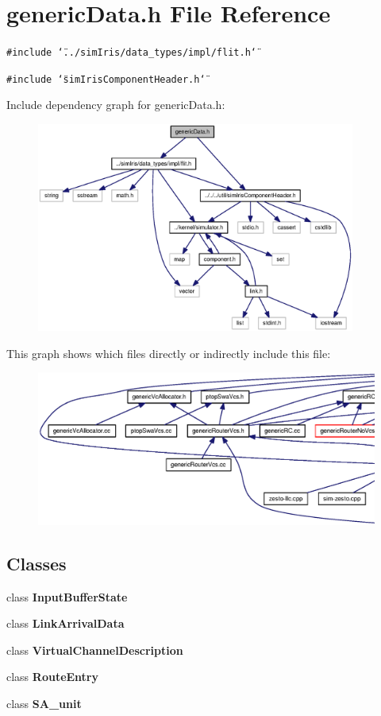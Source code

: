 \section{genericData.h File Reference}
\label{genericData_8h}
{\tt \#include \char`\"{}../simIris/data\_\-types/impl/flit.h\char`\"{}}\par
{\tt \#include \char`\"{}simIrisComponentHeader.h\char`\"{}}\par


Include dependency graph for genericData.h:\nopagebreak
\begin{figure}[H]
\begin{center}
\leavevmode
\includegraphics[width=297pt]{genericData_8h__incl}
\end{center}
\end{figure}


This graph shows which files directly or indirectly include this file:\nopagebreak
\begin{figure}[H]
\begin{center}
\leavevmode
\includegraphics[width=420pt]{genericData_8h__dep__incl}
\end{center}
\end{figure}
\subsection*{Classes}
\begin{CompactItemize}
\item 
class {\bf InputBufferState}
\item 
class {\bf LinkArrivalData}
\item 
class {\bf VirtualChannelDescription}
\item 
class {\bf RouteEntry}
\item 
class {\bf SA\_\-unit}
\end{CompactItemize}
